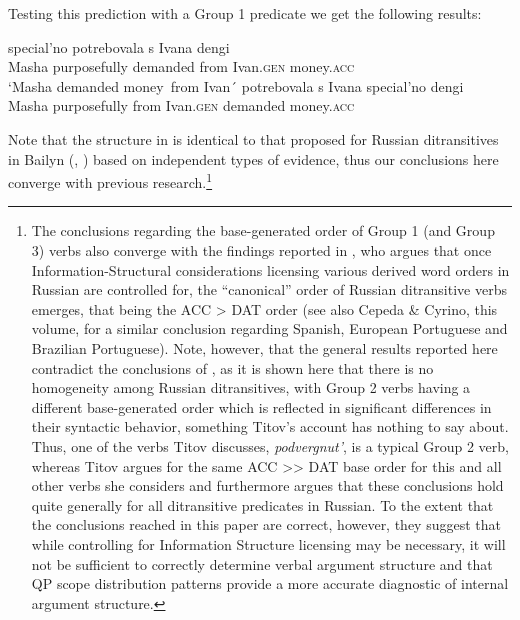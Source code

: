 \documentclass[output=paper,colorlinks,citecolor=brown]{./langscibook}
\begin{document}
Testing this prediction with a Group 1 predicate we get the following results:

\ea%
    \label{ex:antonyuk:48}
    \ea \label{ex:antonyuk:48a}
       {special’no}    {potrebovala} {s}       {Ivana}      {dengi}\\
    Masha purposefully demanded     from Ivan.\textsc{gen} money.\textsc{acc}\\
    \glt `Masha demanded money~from Ivan´
    \ex \label{ex:antonyuk:48b}
       {potrebovala}  {s}       {Ivana}       {special’no} {dengi}\\
    Masha purposefully from Ivan.\textsc{gen} demanded  money.\textsc{acc}\\
    \z
\z

Note that the structure in  is identical to that proposed for Russian ditransitives in Bailyn (\citeyear{Bailyn1995}, \citeyear{Bailyn2012}) based on independent types of evidence, thus our conclusions here converge with previous research.\footnote{The conclusions regarding the base-generated order of Group 1 (and Group 3) verbs also converge with the findings reported in \citet{Titov2017}, who argues that once Information-Structural considerations licensing various derived word orders in Russian are controlled for, the “canonical” order of Russian ditransitive verbs emerges, that being the ACC > DAT order (see also Cepeda \& Cyrino, this volume, for a similar conclusion regarding Spanish, European Portuguese and Brazilian Portuguese). Note, however, that the general results reported here contradict the conclusions of \citet{Titov2017}, as it is shown here that there is no homogeneity among Russian ditransitives, with Group 2 verbs having a different base-generated order which is reflected in significant differences in their syntactic behavior, something Titov’s account has nothing to say about. Thus, one of the verbs Titov discusses, \textit{podvergnut’}, is a typical Group 2 verb, whereas Titov argues for the same ACC >> DAT base order for this and all other verbs she considers and furthermore argues that these conclusions hold quite generally for all ditransitive predicates in Russian. To the extent that the conclusions reached in this paper are correct, however, they suggest that while controlling for Information Structure licensing may be necessary, it will not be sufficient to correctly determine verbal argument structure and that QP scope distribution patterns provide a more accurate diagnostic of internal argument structure.} 
\end{document}
